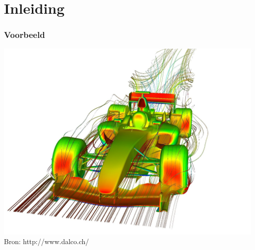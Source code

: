 \documentclass[t]{beamer}
\subtitle{Behoudsvergelijkingen langs stroomlijnen}
\begin{document}
	\frame{\titlepage}
	\section{Inleiding}
	\begin{frame}
		\frametitle{Voorbeeld}
		\center
    	\includegraphics[height=0.8\textheight]{../fig/deeltjesvergelijkingen/Dalco_Supercomputer_CFD_BMW_F1_PressurePath.jpg}\\
		\footnotesize{Bron: http://www.dalco.ch/}
  	\end{frame}
\end{document}
